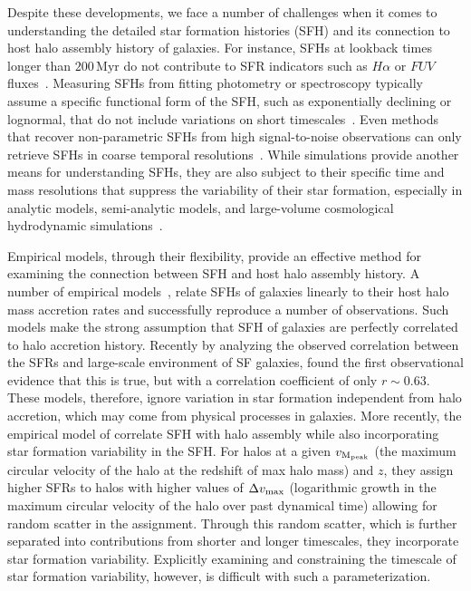 \documentclass[12pt, letterpaper, preprint, tighten]{aastex62}
\newcommand{\edt}[1]{{\color{dred}{\bf} #1}}
\begin{document}
Despite these developments, we face a number of challenges when it comes
to understanding the detailed star formation histories (SFH) and its
connection to host halo assembly history of galaxies.
For instance, SFHs at lookback times longer than $200\,\mathrm{Myr}$
do not contribute to SFR indicators such as $H\alpha$ or $FUV$ fluxes~\cite{sparre2017}.
Measuring SFHs from fitting photometry or spectroscopy typically
assume a specific functional form of the SFH, such as exponentially
declining or lognormal, that do not include variations on short
timescales~\citep[\emph{e.g.}][]{wilkinson2017, carnall2018}.
Even methods that recover non-parametric SFHs from high signal-to-noise
observations can only retrieve SFHs in coarse temporal resolutions~\citep[\emph{e.g.}][]{tojeiro2009, leja2018a}.
While simulations provide another means for understanding SFHs,
they are also subject to their specific time and mass resolutions that
suppress the variability of their star formation, especially in
analytic models, semi-analytic models, and large-volume cosmological
hydrodynamic simulations~\citep[][see also Figure~\ref{fig:illsfh}]{sparre2015, sparre2017}.

Empirical models, \edt{through their} flexibility, provide an effective 
method for examining the connection between SFH and host halo assembly 
history. A number of empirical models~\citep{taghizadeh-popp2015, becker2015, rodriguez-puebla2016a, mitra2017, cohn2017, moster2017},
relate SFHs of galaxies linearly to their host halo mass accretion
rates and successfully reproduce a number of observations. Such models
make the strong assumption that SFH of galaxies are perfectly 
correlated to halo accretion history. 
\edt{Recently by analyzing the observed correlation between the SFRs 
and large-scale environment of SF galaxies, \cite{tinker2018b} found the 
first observational evidence that this is true, but with a correlation 
coefficient of only $r \sim 0.63$.}
These models, therefore, ignore variation in star formation independent 
from halo accretion, which may come from physical processes in galaxies. 
More recently, the empirical model of \cite{behroozi2018} correlate SFH
with halo assembly while also incorporating star formation variability in
the SFH. For halos at a given $v_{\rm M_{peak}}$ (the maximum circular
velocity of the halo at the redshift of max halo mass) and $z$, they
assign higher SFRs to halos with higher values of $\Delta v_{\rm max}$
(logarithmic growth in the maximum circular velocity of the halo over past dynamical time)
allowing for random scatter in the assignment. Through this random scatter,
which is further separated into contributions from shorter and longer timescales,
they incorporate star formation variability. Explicitly examining and constraining
the timescale of star formation variability, however, is difficult with such a
parameterization.
\end{document}
